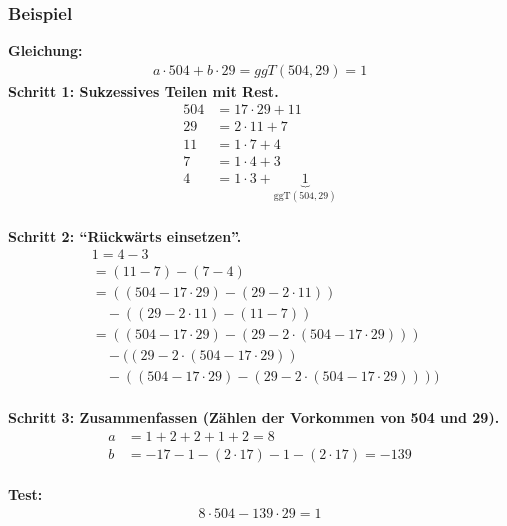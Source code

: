 \subsubsection{Beispiel}
\textbf{Gleichung:} 
\begin{align*}
    a \cdot 504 + b \cdot 29 = ggT(504,29) = 1
\end{align*}
\textbf{Schritt 1: Sukzessives Teilen mit Rest.}
\begin{align*}
	504 & = 17 \cdot 29 + 11                                \\
	29  & = 2 \cdot 11 + 7                                  \\
	11  & = 1 \cdot 7 + 4                                   \\
	7   & = 1 \cdot 4 + 3                                   \\
	4   & = 1 \cdot 3 + \underbrace{1}_{\text{ggT}(504,29)}
\end{align*}
\\
\textbf{Schritt 2: ``Rückwärts einsetzen''.}
\begin{align*}
	 & 1 = 4 - 3                                                                                      \\
	 & = (11-7) - (7-4)                                                                               \\
	 & = ((504-17 \cdot 29) - (29-2 \cdot 11))                                                        \\
     & \quad - ((29-2 \cdot 11) - (11-7))                                                                    \\
	 & = ((504-17 \cdot 29) - (29-2 \cdot (504-17 \cdot 29)))                                         \\
	 & \quad -((29-2 \cdot (504-17 \cdot 29))                                                       \\
     & \quad -((504-17 \cdot 29) - (29-2 \cdot (504-17 \cdot 29))))
\end{align*}
\\
\textbf{Schritt 3: Zusammenfassen (Zählen der Vorkommen von 504 und 29).}
\begin{align*}
	a & = 1 + 2 + 2 + 1 + 2 = 8                            \\
	b & = -17 - 1 - (2 \cdot 17) - 1 - (2 \cdot 17) = -139
\end{align*}
\\
\textbf{Test:}
\begin{align*}
    8 \cdot 504 - 139 \cdot 29 = 1
\end{align*}
